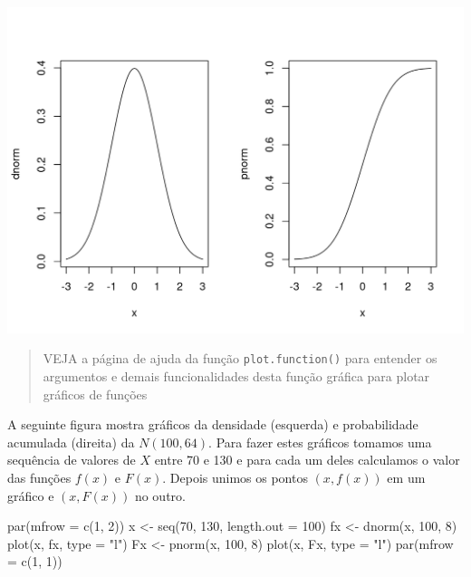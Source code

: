 \documentclass[
  10pt,
  a4paper]{book}
\newenvironment{Shaded}{\begin{snugshade}}{\end{snugshade}}
\newcommand{\AttributeTok}[1]{\textcolor[rgb]{0.77,0.63,0.00}{#1}}
\newcommand{\DecValTok}[1]{\textcolor[rgb]{0.00,0.00,0.81}{#1}}
\newcommand{\FunctionTok}[1]{\textcolor[rgb]{0.00,0.00,0.00}{#1}}
\newcommand{\NormalTok}[1]{#1}
\newcommand{\OtherTok}[1]{\textcolor[rgb]{0.56,0.35,0.01}{#1}}
\newcommand{\StringTok}[1]{\textcolor[rgb]{0.31,0.60,0.02}{#1}}
\begin{document}
\begin{center}\includegraphics{figures/unnamed-chunk-344-1} \end{center}

\begin{quote}
VEJA a página de ajuda da função \texttt{plot.function()} para entender os
argumentos e demais funcionalidades desta função gráfica para plotar
gráficos de funções
\end{quote}

A seguinte figura mostra gráficos da densidade (esquerda) e
probabilidade acumulada (direita) da \(N(100, 64)\). Para fazer estes
gráficos tomamos uma sequência de valores de \(X\) entre 70 e 130 e para
cada um deles calculamos o valor das funções \(f(x)\) e \(F(x)\). Depois
unimos os pontos \((x,f(x))\) em um gráfico e \((x,F(x))\) no outro.

\begin{Shaded}
\begin{Highlighting}[]
\FunctionTok{par}\NormalTok{(}\AttributeTok{mfrow =} \FunctionTok{c}\NormalTok{(}\DecValTok{1}\NormalTok{, }\DecValTok{2}\NormalTok{))}
\NormalTok{x }\OtherTok{\textless{}{-}} \FunctionTok{seq}\NormalTok{(}\DecValTok{70}\NormalTok{, }\DecValTok{130}\NormalTok{, }\AttributeTok{length.out =} \DecValTok{100}\NormalTok{)}
\NormalTok{fx }\OtherTok{\textless{}{-}} \FunctionTok{dnorm}\NormalTok{(x, }\DecValTok{100}\NormalTok{, }\DecValTok{8}\NormalTok{)}
\FunctionTok{plot}\NormalTok{(x, fx, }\AttributeTok{type =} \StringTok{"l"}\NormalTok{)}
\NormalTok{Fx }\OtherTok{\textless{}{-}} \FunctionTok{pnorm}\NormalTok{(x, }\DecValTok{100}\NormalTok{, }\DecValTok{8}\NormalTok{)}
\FunctionTok{plot}\NormalTok{(x, Fx, }\AttributeTok{type =} \StringTok{"l"}\NormalTok{)}
\FunctionTok{par}\NormalTok{(}\AttributeTok{mfrow =} \FunctionTok{c}\NormalTok{(}\DecValTok{1}\NormalTok{, }\DecValTok{1}\NormalTok{))}
\end{Highlighting}
\end{Shaded}
\end{document}
